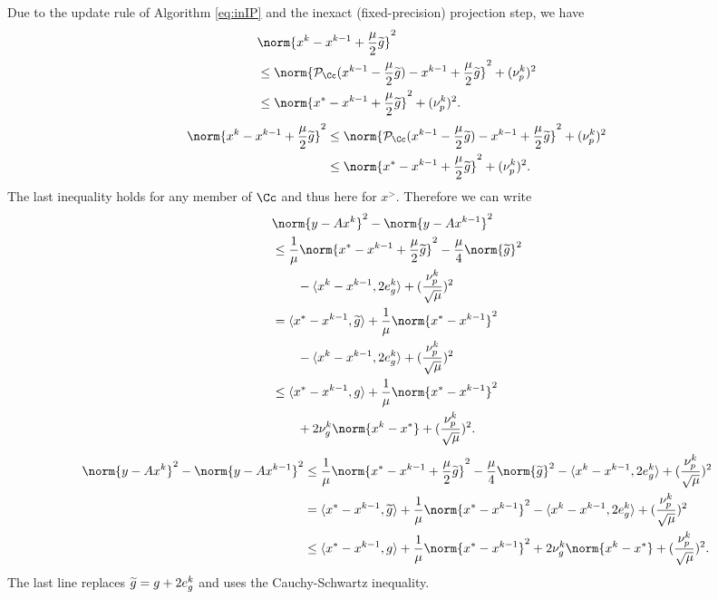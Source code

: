 \fi
Due to the update rule of Algorithm \eqref{eq:inIP} and the inexact (fixed-precision) projection step, we have
\ifCLASSOPTIONtwocolumn
\begin{align*}
	&\norm{x^k-x^{k-1}+\frac{\mu}{2} \g }^2 \\
	&\leq  \norm{\pp_{\Cc}(x^{k-1}-\frac{\mu}{2} \g)-x^{k-1}+\frac{\mu}{2} \g }^2 +(\nup^k)^2\\
	&\leq \norm{x^\gt-x^{k-1}+\frac{\mu}{2} \g }^2 +(\nup^k)^2.
\end{align*}
\else
\begin{align*}
\norm{x^k-x^{k-1}+\frac{\mu}{2} \g }^2 
&\leq  \norm{\pp_{\Cc}(x^{k-1}-\frac{\mu}{2} \g)-x^{k-1}+\frac{\mu}{2} \g }^2 +(\nup^k)^2\\
&\leq \norm{x^\gt-x^{k-1}+\frac{\mu}{2} \g }^2 +(\nup^k)^2.
\end{align*}
\fi
The last inequality holds for any member of $\Cc$ and thus here for $x^\gt$. Therefore we can write
\ifCLASSOPTIONtwocolumn
\begin{align}
&\norm{y-Ax^k}^2-\norm{y-Ax^{k-1}}^2 \nonumber	\\
&\leq \frac{1}{\mu} \norm{x^\gt-x^{k-1}+\frac{\mu}{2} \g }^2 - \frac{\mu}{4} \norm{\g}^2 \nonumber\\
&\qquad - \langle x^k-x^{k-1},2\eg^k \rangle +(\frac{\nup^k}{\sqrt\mu})^2 \nonumber \\
&= \langle x^\gt-x^{k-1},\g \rangle + \frac{1}{\mu} \norm{x^\gt-x^{k-1}}^2 \nonumber\\
&\qquad - \langle x^k-x^{k-1},2\eg^k \rangle 
 +(\frac{\nup^k}{\sqrt\mu})^2\nonumber\\
&\leq \langle x^\gt-x^{k-1},g \rangle + \frac{1}{\mu} \norm{x^\gt-x^{k-1}}^2 \nonumber\\
&\qquad+2\nug^k\norm{x^k-x^*} +(\frac{\nup^k}{\sqrt\mu})^2. \label{eq:p1b2}
\end{align}
\else
\begin{align}
\norm{y-Ax^k}^2-\norm{y-Ax^{k-1}}^2 \nonumber	
&\leq \frac{1}{\mu} \norm{x^\gt-x^{k-1}+\frac{\mu}{2} \g }^2 - \frac{\mu}{4} \norm{\g}^2 
 - \langle x^k-x^{k-1},2\eg^k \rangle +(\frac{\nup^k}{\sqrt\mu})^2 \nonumber \\
&= \langle x^\gt-x^{k-1},\g \rangle + \frac{1}{\mu} \norm{x^\gt-x^{k-1}}^2 
 - \langle x^k-x^{k-1},2\eg^k \rangle 
+(\frac{\nup^k}{\sqrt\mu})^2\nonumber\\
&\leq \langle x^\gt-x^{k-1},g \rangle + \frac{1}{\mu} \norm{x^\gt-x^{k-1}}^2 
+2\nug^k\norm{x^k-x^*} +(\frac{\nup^k}{\sqrt\mu})^2. \label{eq:p1b2}
\end{align}
\fi
The last line replaces $\widetilde g= g+2e_g^k$ and uses the Cauchy-Schwartz inequality. 


